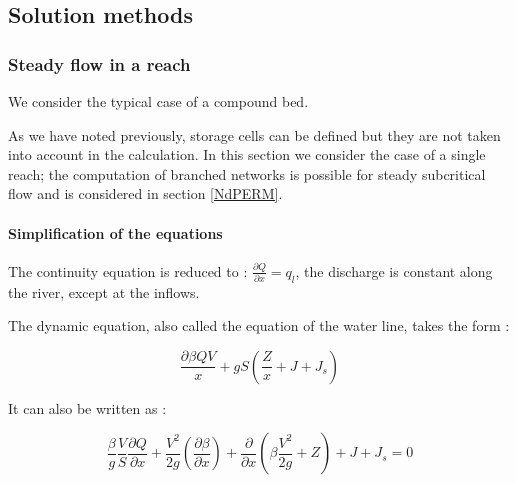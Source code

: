 \subsection{Solution methods} \label{MR}

\subsubsection{Steady flow in a reach}

We consider the typical case of a compound bed.

\vspace{0.5cm}

As we have noted previously, storage cells can be defined but they are not taken into account in the calculation. In this section we consider the case of a single reach; the computation of branched networks is possible for steady subcritical flow and is considered in section \ref{NdPERM}.

\paragraph{Simplification of the equations\\}

\hspace*{1cm}

The continuity equation is reduced to : $\frac{\partial Q}{\partial x}=q_l$, the discharge is constant along the river, except at the inflows.

\vspace{0.5cm}

The dynamic equation, also called the equation of the water line, takes the form :

\begin{equation}
  \frac{\partial \beta Q V}{x} + g S \left ( \frac{Z}{x} +J + J_s \right )
\end{equation}

\vspace{0.5cm}

It can also be written as :

\begin{equation}
  \frac{\beta}{g} \frac{V}{S} \frac{\partial Q}{\partial x} + \frac{V^2}{2 g} \left ( \frac{\partial \beta}{\partial x} \right ) + \frac{\partial}{\partial x} \left ( \beta \frac{V^2}{2 g} + Z \right ) + J + J_s = 0
\end{equation}

\vspace{0.5cm}


